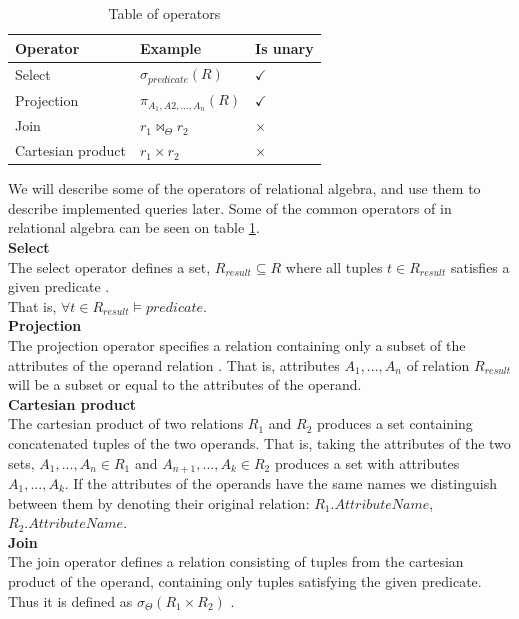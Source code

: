 \begin{table}[h]
    \centering
    \begin{tabular}{|lll|}
    \hline 
    \multicolumn{1}{|l|}{\textbf{Operator}}          & \multicolumn{1}{l|}{\textbf{Example}}   & \multicolumn{1}{l|}{\textbf{Is unary}}      \\ \hline
    \multicolumn{1}{|l|}{Select}                     & \multicolumn{1}{l|}{$\sigma_{predicate}(R)$}             & \multicolumn{1}{l|}{$\checkmark$}           \\ \hline
    \multicolumn{1}{|l|}{Projection}                 & \multicolumn{1}{l|}{$\pi_{A_1, A2,...,A_n}(R)$}             & \multicolumn{1}{l|}{$\checkmark$}           \\ \hline
    \multicolumn{1}{|l|}{Join}                 & \multicolumn{1}{l|}{$r_1 \Join_\Theta r_2$}             & \multicolumn{1}{l|}{$\times$}           \\ \hline
    \multicolumn{1}{|l|}{Cartesian product}          & \multicolumn{1}{l|}{$r_1\times r_2$}              & \multicolumn{1}{l|}{$\times$}            \\ \hline
    \end{tabular}
    \caption{Table of operators}
    \label{Relational algebra operators}
\end{table}

We will describe some of the operators of relational algebra, and use them to describe implemented queries later.
Some of the common operators of in relational algebra can be seen on table \ref{Relational algebra operators}.\\
\textbf{Select}\\
The select operator defines a set, $R_{result}\subseteq R$ where all tuples $t \in R_{result}$ satisfies a given predicate \cite[Chapter 2.6.1]{DBSBook}.\\
That is, $\forall t \in R_{result} \vDash predicate$.\\
\textbf{Projection}\\
The projection operator specifies a relation containing only a subset of the attributes of the operand relation \cite[Chapter 2.6.2]{DBSBook}.
That is, attributes $A_1, ..., A_n$ of relation $R_{result}$ will be a subset or equal to the attributes of the operand.\\
\textbf{Cartesian product}\\
The cartesian product of two relations $R_1$ and $R_2$ produces a set containing concatenated tuples of the two operands.
That is, taking the attributes of the two sets, $A_1,...,A_n \in R_1$ and $A_{n+1},...,A_k \in R_2$ produces a set with attributes $A_1,...,A_k$.
If the attributes of the operands have the same names we distinguish between them  by denoting their original relation: $R_1.AttributeName$, $R_2.AttributeName$. \cite[Chapter 2.6.4]{DBSBook}\\   
\textbf{Join}\\
The join operator defines a relation consisting of tuples from the cartesian product of the operand, containing only tuples satisfying the given predicate.
Thus it is defined as $\sigma_{\Theta} (R_1 \times R_2)$ \cite[Chapter 2.6.5]{DBSBook}.

